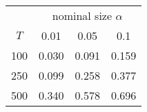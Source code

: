 % 
\begin{tabular}{cccc}
  \hline
  & \multicolumn{3}{c}{nominal size $\alpha$} \\
 $T$ & 0.01 & 0.05 & 0.1 \\
 \hline
100 & 0.030 & 0.091 & 0.159 \\ 
  250 & 0.099 & 0.258 & 0.377 \\ 
  500 & 0.340 & 0.578 & 0.696 \\ 
   \hline
\end{tabular}
